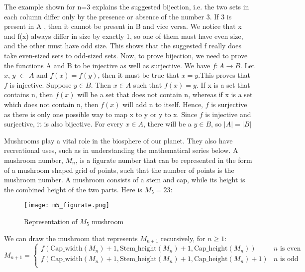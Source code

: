 \documentclass[addpoints]{exam}
\begin{document}
\begin{questions}
  \begin{solution}
    The example shown for n=3 explains the suggested bijection, i.e. the two sets in each column differ only by the presence or absence of the number 3. If 3 is present in A , then it cannot be present in B and vice versa. We notice that x and f(x) always differ in size by exactly 1, so one of them must have even size, and the other must have odd size. This shows that the suggested f really does take even-sized sets to odd-sized sets. Now, to prove bijection, we need to prove the functions A and B to be injective as well as surjective. \newline
    We have $f : A \rightarrow B$.
    Let $x$, $y$ $\in$ $A$ and $f(x)=f(y)$,  then it must be true that $x=y$.This proves that $f$ is injective.\newline
    Suppose $y \in B$. Then $x \in A$ such that $f(x)=y$. If x is a set that contains n, then $f(x)$ will be a set that does not contain n, whereas if x is a set which does not contain n, then $f(x)$ will add n to itself. Hence, $f$ is surjective as there is only one possible way to map x to y or y to x. \newline
    Since $f$ is injective and surjective, it is also bijective. \newline
    For every $x \in A$, there will be a $y \in B$, so $|A| = |B|$
  \end{solution}
  
\question Mushrooms play a vital role in the biosphere of our planet. They also have recreational uses, such as in understanding the mathematical series below. A mushroom number, $M_n$, is a figurate number that can be represented in the form of a mushroom shaped grid of points, such that the number of points is the mushroom number. A mushroom consists of a stem and cap, while its height is the combined height of the two parts. Here is $M_5=23$:

\begin{figure}[h]
  \centering
  \texttt{[image: m5\_figurate.png]}
  \caption{Representation of $M_5$ mushroom}
  \label{fig:mushroom_anatomy}
\end{figure}

We can draw the mushroom that represents $M_{n+1}$ recursively, for $n \geq 1$:
\[ 
    M_{n+1}=
    \begin{cases} 
      f(\textrm{Cap\_width}(M_n) + 1, \textrm{Stem\_height}(M_n) + 1, \textrm{Cap\_height}(M_n))  & n \textrm{ is even} \\
      f(\textrm{Cap\_width}(M_n) + 1, \textrm{Stem\_height}(M_n) + 1, \textrm{Cap\_height}(M_n)+1) & n \textrm{ is odd}  \\      
   \end{cases}
\]


\end{questions}
\end{document}
